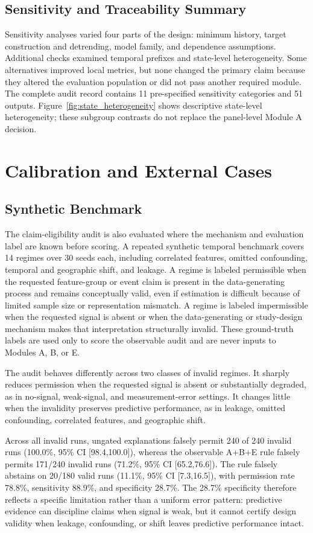 \documentclass[conference]{IEEEtran}
\begin{document}
\subsection{Sensitivity and Traceability Summary}
Sensitivity analyses varied four parts of the design: minimum history, target
construction and detrending, model family, and dependence assumptions. Additional
checks examined temporal prefixes and state-level heterogeneity. Some
alternatives improved local metrics, but none changed the primary claim because
they altered the evaluation population or did not pass another required module. The
complete audit record contains 11 pre-specified sensitivity categories and 51
outputs.
Figure~\ref{fig:state_heterogeneity} shows descriptive state-level heterogeneity;
these subgroup contrasts do not replace the panel-level Module A decision.

\section{Calibration and External Cases}
\subsection{Synthetic Benchmark}
The claim-eligibility audit is also evaluated where the mechanism and evaluation
label are known before scoring. A repeated synthetic temporal benchmark covers 14
regimes over 30 seeds each, including correlated features, omitted confounding,
temporal and geographic shift, and leakage. A regime is labeled permissible when
the requested feature-group or event claim is present in the data-generating
process and remains conceptually valid, even if estimation is difficult because
of limited sample size or representation mismatch. A regime is labeled
impermissible when the requested signal is absent or when the data-generating or
study-design mechanism makes that interpretation structurally invalid. These
ground-truth labels are used only to score the observable audit and are never
inputs to Modules A, B, or E.

The audit behaves differently across two classes of invalid regimes. It sharply
reduces permission when the requested signal is absent or substantially degraded,
as in no-signal, weak-signal, and measurement-error settings. It changes little
when the invalidity preserves predictive performance, as in leakage, omitted
confounding, correlated features, and geographic shift.

Across all invalid runs, ungated explanations falsely permit 240 of 240 invalid
runs (100.0\%, 95\% CI [98.4,100.0]), whereas the observable A+B+E rule falsely
permits 171/240 invalid runs (71.2\%, 95\% CI [65.2,76.6]). The rule falsely
abstains on 20/180 valid runs (11.1\%, 95\% CI [7.3,16.5]), with permission rate
78.8\%, sensitivity 88.9\%, and specificity 28.7\%. The 28.7\% specificity
therefore reflects a specific limitation rather than a uniform error pattern: predictive
evidence can discipline claims when signal is weak, but it cannot certify design
validity when leakage, confounding, or shift leaves predictive performance
intact.
\end{document}

